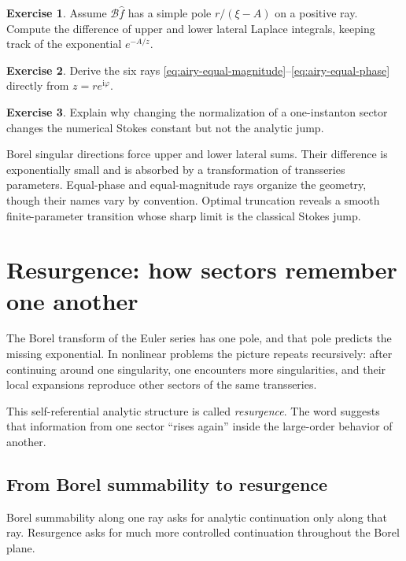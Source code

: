\documentclass[11pt,openany]{book}
\theoremstyle{definition}
\newtheorem{exercise}{Exercise}[chapter]
\theoremstyle{plain}
\theoremstyle{remark}
\newcommand{\ii}{\mathrm{i}}
\newcommand{\trans}[1]{\widehat{#1}}
\newcommand{\Borel}{\mathcal{B}}
\begin{document}
\begin{exercise}
Assume $\Borel\trans f$ has a simple pole $r/(\xi-A)$ on a positive ray. Compute the difference of upper and lower lateral Laplace integrals, keeping track of the exponential $e^{-A/z}$.
\end{exercise}

\begin{exercise}
Derive the six rays \eqref{eq:airy-equal-magnitude}--\eqref{eq:airy-equal-phase} directly from $z=re^{\ii\varphi}$.
\end{exercise}

\begin{exercise}
Explain why changing the normalization of a one-instanton sector changes the numerical Stokes constant but not the analytic jump.
\end{exercise}

\begin{summarybox}
Borel singular directions force upper and lower lateral sums. Their difference is exponentially small and is absorbed by a transformation of transseries parameters. Equal-phase and equal-magnitude rays organize the geometry, though their names vary by convention. Optimal truncation reveals a smooth finite-parameter transition whose sharp limit is the classical Stokes jump.
\end{summarybox}

\chapter{Resurgence: how sectors remember one another}\label{ch:resurgence}

The Borel transform of the Euler series has one pole, and that pole predicts the missing exponential. In nonlinear problems the picture repeats recursively: after continuing around one singularity, one encounters more singularities, and their local expansions reproduce other sectors of the same transseries.

This self-referential analytic structure is called \emph{resurgence}. The word suggests that information from one sector ``rises again'' inside the large-order behavior of another.

\section{From Borel summability to resurgence}

Borel summability along one ray asks for analytic continuation only along that ray. Resurgence asks for much more controlled continuation throughout the Borel plane.
\end{document}
